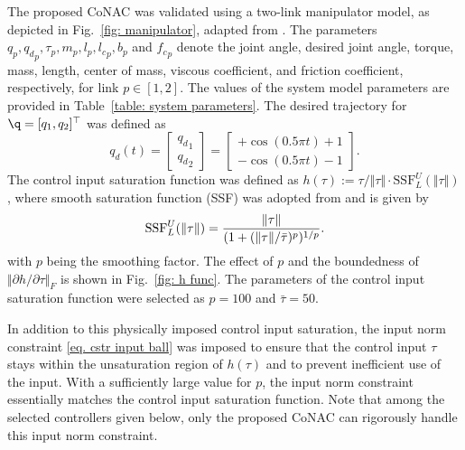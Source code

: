 \documentclass[lettersize,journal]{IEEEtran}
\begin{document}
The proposed CoNAC was validated using a two-link manipulator model, as depicted in Fig.~\ref{fig: manipulator}, adapted from \cite{Markus:2013aa}. 
The parameters $q_p,{q_d}_p,\tau_p,m_p,l_p,{l_c}_p,b_p$ and ${f_c}_p$ denote the joint angle, desired joint angle, torque, mass, length, center of mass, viscous coefficient, and friction coefficient, respectively, for link $p\in[1,2]$.
The values of the system model parameters are provided in Table~\ref{table: system parameters}. The desired trajectory for $\q=[q_1,q_2]^\top $ was defined as
\begin{equation}
    {q_d}(t) = 
    \begin{bmatrix}
        {q_d}_1\\{q_d}_2
    \end{bmatrix}
    =
    \begin{bmatrix}
        +\cos(0.5\pi t) + 1 \\
        -\cos(0.5\pi t) - 1 
    \end{bmatrix}.
\end{equation}
The control input saturation function was defined as $h(\tau):= \tau/\Vert\tau\Vert \cdot \text{SSF}_L^U(\Vert\tau\Vert)$, where smooth saturation function (SSF) was adopted from \cite{Vasquez-Plaza:2023aa} and is given by
\begin{equation}
    \text{SSF}_L^U(\Vert\tau\Vert) = {\Vert\tau\Vert\over (1+(\Vert\tau\Vert/\bar\tau)^p)^{1/p}}.
    \label{eq. h func}
\end{equation}
with $p$ being the smoothing factor. The effect of $p$ and the boundedness of $\Vert\partial h/\partial \tau\Vert_F$ is shown in Fig.~\ref{fig: h func}.
The parameters of the control input saturation function were selected as $p=100$ and $\bar\tau=50$. 

In addition to this physically imposed control input saturation, the input norm constraint \eqref{eq. cstr input ball} was imposed to ensure that the control input $\tau$ stays within the unsaturation region of $h(\tau)$ and to prevent inefficient use of the input. With a sufficiently large value for $p$, the input norm constraint essentially matches the control input saturation function. Note that among the selected controllers given below, only the proposed CoNAC can rigorously handle this input norm constraint.
\end{document}

